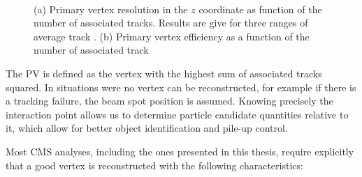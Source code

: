\begin{figure}[htp]%
\centering
{}\qquad
{}\\
\caption[Primary vertex resolution in the $z$ coordinate and vertex reconstruction efficiency as a function of the number of constituent tracks.]
{(a) Primary vertex resolution in the $z$ coordinate as function of the number of associated tracks. Results are give for three ranges of average track \pt. (b) Primary vertex efficiency as a function of the number of associated track~\cite{ARTICLE:CMSTrackingAndPrimaryVertex}}
\label{FIGURE:EventReconstructionAndSimulation_Vertex}
\end{figure}

The \gls{PV} is defined as the vertex with the highest sum of associated tracks \pt squared. In situations were no vertex can be reconstructed, for example if there is a tracking failure, the beam spot position is assumed. Knowing precisely the interaction point allows us to determine particle candidate quantities relative to it, which allow for better object identification and pile-up control. 

\newpage
Most \gls{CMS} analyses, including the ones presented in this thesis, require explicitly that a good vertex is reconstructed with the following characteristics:

